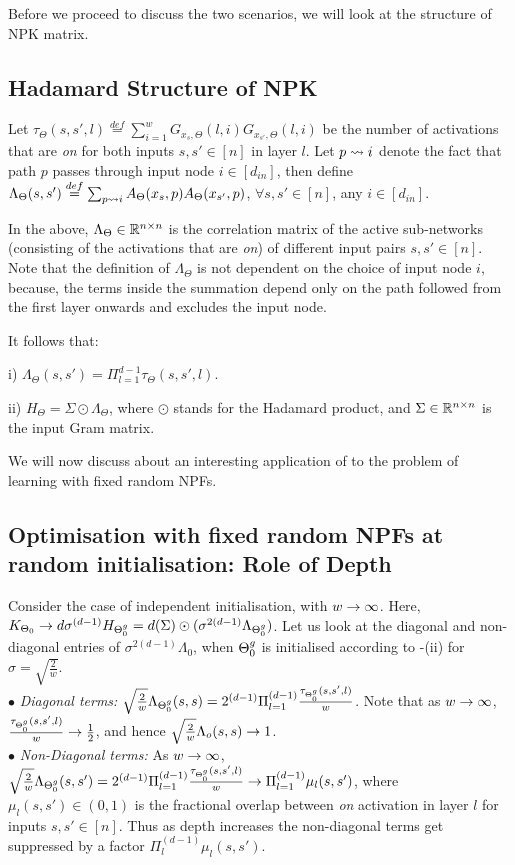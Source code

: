 Before we proceed to discuss the two scenarios, we will look at the structure of NPK matrix.
\subsection{Hadamard Structure of NPK}
\begin{definition}\label{def:lambda}
Let $\tau_{\Theta}(s,s',l)\stackrel{def}=\sum_{i=1}^w G_{x_s,\Theta}(l,i)G_{x_{s'},\Theta}(l,i)$ be the number of activations that are \emph{on} for both inputs $s,s'\in[n]$ in layer $l$. Let $p\rightsquigarrow i$ denote the fact that path $p$ passes through input node $i\in[d_{in}]$, then define $\Lambda_{\Theta}(s,s')\stackrel{def}{=}\sum_{p\rightsquigarrow i} A_{\Theta}(x_s,p) A_{\Theta}(x_{s'},p)$, $\forall s,s'\in[n]$, any $i\in [d_{in}]$.
\end{definition}
In the  above, $\Lambda_{\Theta}\in\mathbb{R}^{n\times n}$ is the correlation matrix of the active sub-networks (consisting of the activations that are \emph{on}) of different input pairs $s,s'\in[n]$. Note that the definition of $\Lambda_{\Theta}$ is not dependent on the choice of input node $i$, because, the terms inside the summation depend only on the path followed from the first layer onwards and excludes the input node.

\begin{lemma}\label{lm:npk}
It follows that:

i) $\Lambda_{\Theta}(s,s')=\Pi_{l=1}^{d-1}\tau_{\Theta}(s,s',l)$.

ii) $H_{\Theta}= \Sigma\odot\Lambda_{\Theta}$, where $\odot$ stands for the Hadamard product, and $\Sigma \in \mathbb{R}^{n\times n}$ is the input Gram matrix.
\end{lemma}


We will now discuss about an interesting application of  to the problem of learning with fixed random NPFs.
\subsection{Optimisation with fixed random NPFs at random initialisation: Role of Depth}
Consider the case of independent initialisation, with $w\rightarrow\infty$. Here, $K_{\Theta_0}\rightarrow d\sigma^{(d-1)}H_{{\Theta}^g_0}=d(\Sigma)\odot(\sigma^{2(d-1)}\Lambda_{{\Theta}^g_0})$. Let us look at the diagonal and non-diagonal entries of $\sigma^{2(d-1)}\Lambda_0$, when ${\Theta}^g_0$ is initialised according to -(ii) for $\sigma=\sqrt{\frac2w}$.\\
$\bullet$ \emph{Diagonal terms:} $\sqrt{\frac2w}\Lambda_{{\Theta}^g_0}(s,s)=2^{(d-1)}\Pi_{l=1}^{(d-1)}\frac{\tau_{{\Theta}^g_0}(s,s',l)}w$. Note that as $w\rightarrow\infty$, $\frac{\tau_{{\Theta}^g_0}(s,s',l)}w\rightarrow\frac12$, and hence $\sqrt{\frac2w}\Lambda_o(s,s)\rightarrow 1$.\\
$\bullet$ \emph{Non-Diagonal terms:} As $w\rightarrow\infty$, $\sqrt{\frac2w}\Lambda_{{\Theta}^g_0}(s,s')=2^{(d-1)}\Pi_{l=1}^{(d-1)}\frac{\tau_{{\Theta}^g_0}(s,s',l)}w\rightarrow \Pi_{l=1}^{(d-1)}\mu_l(s,s')$, where $\mu_l(s,s')\in(0,1)$ is the fractional overlap between \emph{on} activation in layer $l$ for inputs $s,s'\in[n]$. Thus as depth increases the non-diagonal terms get suppressed by a factor $\Pi_{l}^{(d-1)}\mu_{l}(s,s')$.

